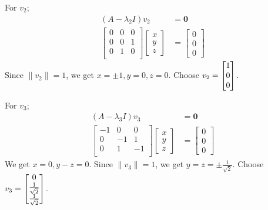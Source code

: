 \documentclass[12pt,final]{novelette} %
\begin{document}
\begin{question}
\begin{question}
        \medskip
        For $v_2$;
        \begin{align*}
            (A - \lambda_2 I)v_2 & = \mathbf{0}     \\
            \begin{bmatrix}
                0 & 0 & 0 \\
                0 & 0 & 1 \\
                0 & 1 & 0 \\
            \end{bmatrix}
            \begin{bmatrix}
                x \\ y \\ z
            \end{bmatrix}
                                 & = \begin{bmatrix}
                                         0 \\ 0 \\ 0
                                     \end{bmatrix}
        \end{align*}
        Since $\lVert v_2 \rVert = 1$, we get $x = \pm 1, y = 0, z = 0$.
        Choose $v_2 = \mqty[1 \\ 0 \\ 0]$.

        \medskip
        For $v_3$;
        \begin{align*}
            (A - \lambda_3 I)v_3 & = \mathbf{0}     \\
            \begin{bmatrix}
                -1 & 0  & 0  \\
                0  & -1 & 1  \\
                0  & 1  & -1 \\
            \end{bmatrix}
            \begin{bmatrix}
                x \\ y \\ z
            \end{bmatrix}
                                 & = \begin{bmatrix}
                                         0 \\ 0 \\ 0
                                     \end{bmatrix}
        \end{align*}
        We get $x = 0, y - z = 0$. Since $\lVert v_3 \rVert = 1$, we get $y = z = \pm \frac1{\sqrt2}$.
        Choose $v_3 = \mqty[0 \\ \frac1{\sqrt2} \\ \frac1{\sqrt2}]$.


\end{question}
\end{question}
\end{document}
